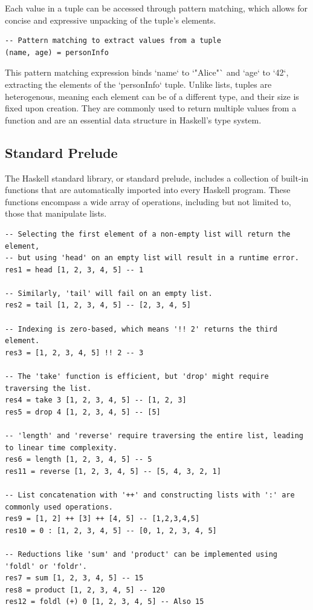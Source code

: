 \documentclass[a4paper, 10pt]{article}
\begin{document}
            \noindent Each value in a tuple can be accessed through pattern matching, which allows for concise and expressive unpacking of the tuple's elements.

            \begin{lstlisting}
-- Pattern matching to extract values from a tuple
(name, age) = personInfo
            \end{lstlisting}

            \noindent This pattern matching expression binds `name` to `"Alice"` and `age` to `42`, extracting the elements of the `personInfo` tuple. Unlike lists, tuples are heterogenous, meaning each element can be of a different type, and their size is fixed upon creation. They are commonly used to return multiple values from a function and are an essential data structure in Haskell's type system.

        \newpage
        \subsection{Standard Prelude}

            The Haskell standard library, or standard prelude, includes a collection of built-in functions that are automatically imported into every Haskell program. These functions encompass a wide array of operations, including but not limited to, those that manipulate lists.

            \lstset{language=Haskell}
            \begin{lstlisting}
-- Selecting the first element of a non-empty list will return the element,
-- but using 'head' on an empty list will result in a runtime error.
res1 = head [1, 2, 3, 4, 5] -- 1

-- Similarly, 'tail' will fail on an empty list.
res2 = tail [1, 2, 3, 4, 5] -- [2, 3, 4, 5]

-- Indexing is zero-based, which means '!! 2' returns the third element.
res3 = [1, 2, 3, 4, 5] !! 2 -- 3

-- The 'take' function is efficient, but 'drop' might require traversing the list.
res4 = take 3 [1, 2, 3, 4, 5] -- [1, 2, 3]
res5 = drop 4 [1, 2, 3, 4, 5] -- [5]

-- 'length' and 'reverse' require traversing the entire list, leading to linear time complexity.
res6 = length [1, 2, 3, 4, 5] -- 5
res11 = reverse [1, 2, 3, 4, 5] -- [5, 4, 3, 2, 1]

-- List concatenation with '++' and constructing lists with ':' are commonly used operations.
res9 = [1, 2] ++ [3] ++ [4, 5] -- [1,2,3,4,5]
res10 = 0 : [1, 2, 3, 4, 5] -- [0, 1, 2, 3, 4, 5]

-- Reductions like 'sum' and 'product' can be implemented using 'foldl' or 'foldr'.
res7 = sum [1, 2, 3, 4, 5] -- 15
res8 = product [1, 2, 3, 4, 5] -- 120
res12 = foldl (+) 0 [1, 2, 3, 4, 5] -- Also 15
            \end{lstlisting}
\end{document}
